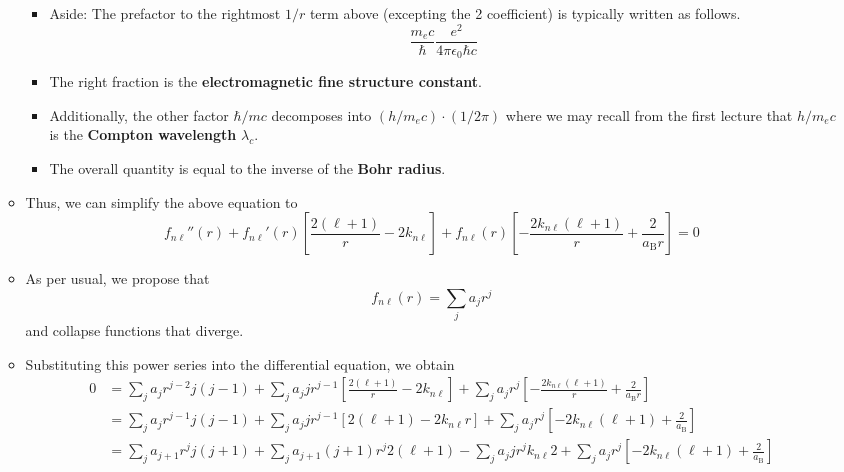\documentclass[../notes.tex]{subfiles}
\begin{document}
\begin{itemize}
\begin{itemize}
\begin{equation*}
        \end{equation*}
        \begin{itemize}
            \item Aside: The prefactor to the rightmost $1/r$ term above (excepting the 2 coefficient) is typically written as follows.
            \begin{equation*}
                \frac{m_ec}{\hbar}\frac{e^2}{4\pi\epsilon_0\hbar c}
            \end{equation*}
            \item The right fraction is the \textbf{electromagnetic fine structure constant}.
            \item Additionally, the other factor $\hbar/mc$ decomposes into $(h/m_ec)\cdot(1/2\pi)$ where we may recall from the first lecture that $h/m_ec$ is the \textbf{Compton wavelength} $\lambda_c$.
            \item The overall quantity is equal to the inverse of the \textbf{Bohr radius}.
        \end{itemize}
        \item Thus, we can simplify the above equation to
        \begin{equation*}
            f_{n\ell}''(r)+f_{n\ell}'(r)\left[ \frac{2(\ell+1)}{r}-2k_{n\ell} \right]+f_{n\ell}(r)\left[ -\frac{2k_{n\ell}(\ell+1)}{r}+\frac{2}{a_\text{B}r} \right] = 0
        \end{equation*}
        \item As per usual, we propose that
        \begin{equation*}
            f_{n\ell}(r) = \sum_ja_jr^j
        \end{equation*}
        and collapse functions that diverge.
        \item Substituting this power series into the differential equation, we obtain
        \begin{align*}
            0 &= \sum_ja_jr^{j-2}j(j-1)+\sum_ja_jjr^{j-1}\left[ \frac{2(\ell+1)}{r}-2k_{n\ell} \right]+\sum_ja_jr^j\left[ -\frac{2k_{n\ell}(\ell+1)}{r}+\frac{2}{a_\text{B}r} \right]\\
            &= \sum_ja_jr^{j-1}j(j-1)+\sum_ja_jjr^{j-1}[2(\ell+1)-2k_{n\ell}r]+\sum_ja_jr^j\left[ -2k_{n\ell}(\ell+1)+\frac{2}{a_\text{B}} \right]\\
            &= \sum_ja_{j+1}r^jj(j+1)+\sum_ja_{j+1}(j+1)r^j2(\ell+1)-\sum_ja_jjr^jk_{n\ell}2+\sum_ja_jr^j\left[ -2k_{n\ell}(\ell+1)+\frac{2}{a_\text{B}} \right]
        \end{align*}

\end{itemize}
\end{itemize}
\end{document}
